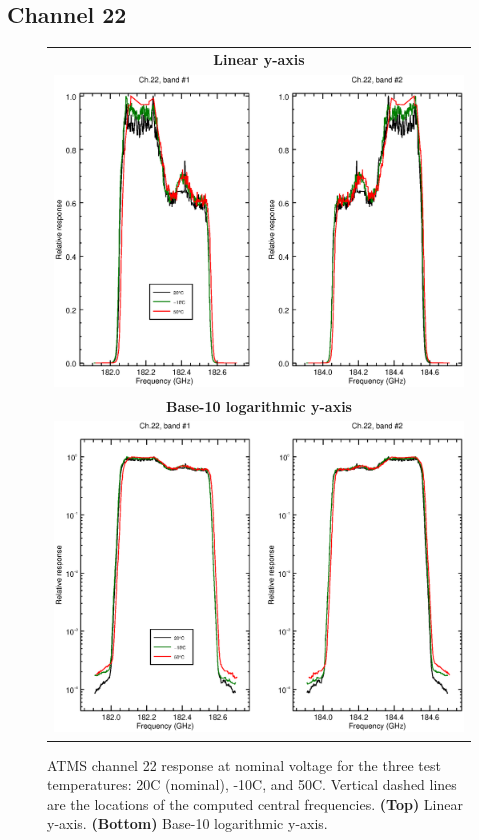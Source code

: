 \subsection{Channel 22}
\begin{figure}[H]
  \label{fig:Tset.ch22_response}
  \centering
  \begin{tabular}{c}
    \hspace{0.75cm}\sffamily\textbf{Linear y-axis} \\
    \includegraphics[scale=0.55]{graphics/srf/Tset/lin/atms_npp-22.eps} \\
    \hspace{0.75cm}\sffamily\textbf{Base-10 logarithmic y-axis} \\
    \includegraphics[scale=0.55]{graphics/srf/Tset/log/atms_npp-22.eps}
  \end{tabular}
  \caption{ATMS channel 22 response at nominal voltage for the three test temperatures: 20\textdegree{}C (nominal), -10\textdegree{}C, and 50\textdegree{}C. Vertical dashed lines are the locations of the computed central frequencies. \textbf{(Top)} Linear y-axis. \textbf{(Bottom)} Base-10 logarithmic y-axis.}
\end{figure}
